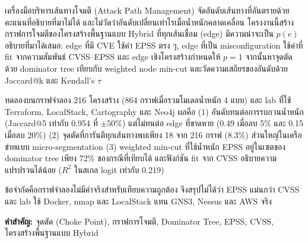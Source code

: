 เครื่องมือบริหารเส้นทางโจมตี (Attack Path Management) จัดอันดับเส้นทางที่อันตรายด้วยคะแนนที่อธิบายที่มาไม่ได้
และไม่วัดว่าอันดับเปลี่ยนเท่าไรเมื่อน้ำหนักคลาดเคลื่อน
โครงงานนี้สร้างกราฟการโจมตีของโครงสร้างพื้นฐานแบบ Hybrid ที่ทุกเส้นเชื่อม (edge) มีความน่าจะเป็น $p(e)$ อธิบายที่มาได้เสมอ:
edge ที่มี CVE ใช้ค่า EPSS ตรง ๆ, edge ที่เป็น misconfiguration ใช้ค่าที่ fit จากความสัมพันธ์ CVSS--EPSS
และ edge เชิงโครงสร้างกำหนดให้ $p=1$
จากนั้นหาจุดตัดด้วย dominator tree เทียบกับ weighted node min-cut
และวัดความเสถียรของอันดับด้วย Jaccard@k และ Kendall's $\tau$

ทดลองบนกราฟจำลอง 216 โครงสร้าง (864 กราฟเมื่อรวมโมเดลน้ำหนัก 4 แบบ) และ lab ที่ใช้ Terraform, LocalStack, Cartography และ Neo4j
ผลคือ (1) อันดับทนต่อการรบกวนน้ำหนัก (Jaccard@5 เท่ากับ 0.954 ที่ $\pm 50\%$)
แต่ไม่ทนต่อ edge ที่ขาดหาย (0.49 เมื่อลบ 5\% และ 0.15 เมื่อลบ 20\%)
(2) จุดตัดที่การันตีทุกเส้นทางพบเพียง 18 จาก 216 กราฟ (8.3\%) ส่วนใหญ่ในเครือข่ายแบบ micro-segmentation
(3) weighted min-cut ที่ใช้น้ำหนัก EPSS อยู่ในเซตของ dominator tree เพียง 72\% ของกรณีที่เทียบได้
และฟังก์ชัน fit จาก CVSS อธิบายความแปรปรวนได้น้อย ($R^2$ ในสเกล logit เท่ากับ 0.219)

ข้อจำกัดคือกราฟจำลองไม่มีค่าจริงสำหรับเทียบความถูกต้อง จึงสรุปไม่ได้ว่า EPSS แม่นกว่า CVSS
และ lab ใช้ Docker, nmap และ LocalStack แทน GNS3, Nessus และ AWS จริง

\vspace{0.4cm}
\noindent\textbf{คำสำคัญ:} จุดตัด (Choke Point), กราฟการโจมตี, Dominator Tree, EPSS, CVSS, โครงสร้างพื้นฐานแบบ Hybrid
